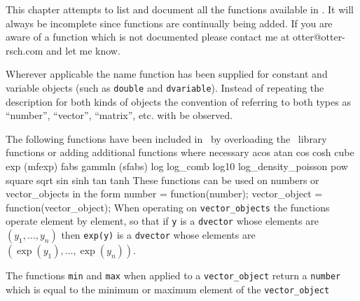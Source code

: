 
\def\leftset#1{#1\hfill}
This chapter attempts to list and document all the functions
available in \ADM. It will always be incomplete since functions are
continually being added. If you are aware of a function which is
not documented please contact me at otter@otter-rsch.com and
let me know.

Wherever applicable the name function has been supplied for
constant and variable objects (such as {\tt double} and {\tt dvariable}).
Instead of repeating the description for both kinds of objects
the convention of referring to both types as ``number'', ``vector'',
``matrix'', etc. with be observed.

 The following functions have been included in \AD\ by overloading the 
\cplus\ library functions or adding additional functions where necessary
\beginexamplea
  acos atan  cos cosh cube exp (mfexp) fabs gammln (sfabs) log log_comb 
  log10 log_density_poisson pow square sqrt sin sinh tan tanh
\endexample
{}       
      
   
   
   
   
   
   
\noindent These functions can be used on numbers or vector\_objects
in the form 
\beginexample
number = function(number);
vector_object = function(vector_object);
\endexample
\noindent When operating on {\tt vector\_objects} the functions operate  
element by element, so that if {\tt y} is a {\tt dvector} whose
elements are $(y_1,\ldots,y_n)$ then {\tt exp(y)} is a 
{\tt dvector} whose elements are $(\exp(y_1),\ldots,\exp(y_n))$.

The functions {\tt min} and {\tt max} when applied to a {\tt vector\_object}
return a {\tt number} which is equal to the minimum or maximum element of the
{\tt vector\_object}

